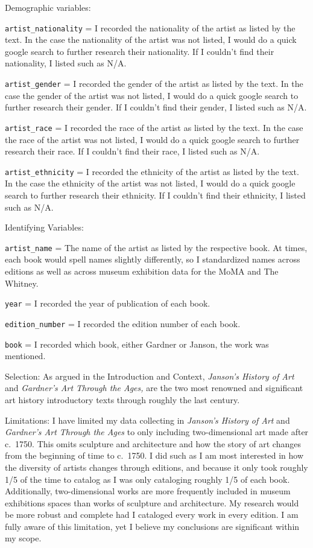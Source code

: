 \documentclass[
  letterpaper,
  DIV=11,
  numbers=noendperiod]{scrreprt}
\begin{document}
Demographic variables:

\texttt{artist\_nationality} = I recorded the nationality of the artist
as listed by the text. In the case the nationality of the artist was not
listed, I would do a quick google search to further research their
nationality. If I couldn't find their nationality, I listed such as N/A.

\texttt{artist\_gender} = I recorded the gender of the artist as listed
by the text. In the case the gender of the artist was not listed, I
would do a quick google search to further research their gender. If I
couldn't find their gender, I listed such as N/A.

\texttt{artist\_race} = I recorded the race of the artist as listed by
the text. In the case the race of the artist was not listed, I would do
a quick google search to further research their race. If I couldn't find
their race, I listed such as N/A.

\texttt{artist\_ethnicity} = I recorded the ethnicity of the artist as
listed by the text. In the case the ethnicity of the artist was not
listed, I would do a quick google search to further research their
ethnicity. If I couldn't find their ethnicity, I listed such as N/A.

Identifying Variables:

\texttt{artist\_name} = The name of the artist as listed by the
respective book. At times, each book would spell names slightly
differently, so I standardized names across editions as well as across
museum exhibition data for the MoMA and The Whitney.

\texttt{year} = I recorded the year of publication of each book.

\texttt{edition\_number} = I recorded the edition number of each book.

\texttt{book} = I recorded which book, either Gardner or Janson, the
work was mentioned.

Selection: As argued in the Introduction and Context, \emph{Janson's
History of Art} and \emph{Gardner's Art Through the Ages,} are the two
most renowned and significant art history introductory texts through
roughly the last century.

Limitations: I have limited my data collecting in \emph{Janson's History
of Art} and \emph{Gardner's Art Through the Ages} to only including
two-dimensional art made after c.~1750. This omits sculpture and
architecture and how the story of art changes from the beginning of time
to c.~1750. I did such as I am most interested in how the diversity of
artists changes through editions, and because it only took roughly 1/5
of the time to catalog as I was only cataloging roughly 1/5 of each
book. Additionally, two-dimensional works are more frequently included
in museum exhibitions spaces than works of sculpture and architecture.
My research would be more robust and complete had I cataloged every work
in every edition. I am fully aware of this limitation, yet I believe my
conclusions are significant within my scope.
\end{document}
